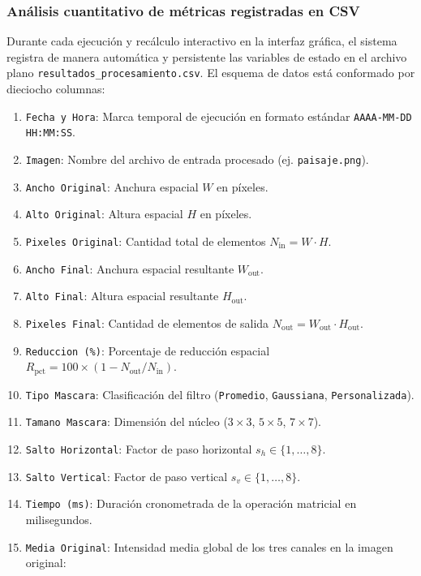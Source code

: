 \documentclass[11pt]{article}
\begin{document}
\subsubsection{Análisis cuantitativo de métricas registradas en CSV}

Durante cada ejecución y recálculo interactivo en la interfaz gráfica, el sistema registra de manera automática y persistente las variables de estado en el archivo plano \texttt{resultados\_procesamiento.csv}. El esquema de datos está conformado por dieciocho columnas:
\begin{enumerate}[itemsep=0.15em]
\item \texttt{Fecha y Hora}: Marca temporal de ejecución en formato estándar \texttt{AAAA-MM-DD HH:MM:SS}.
\item \texttt{Imagen}: Nombre del archivo de entrada procesado (ej. \texttt{paisaje.png}).
\item \texttt{Ancho Original}: Anchura espacial $W$ en píxeles.
\item \texttt{Alto Original}: Altura espacial $H$ en píxeles.
\item \texttt{Pixeles Original}: Cantidad total de elementos $N_{\text{in}} = W \cdot H$.
\item \texttt{Ancho Final}: Anchura espacial resultante $W_{\text{out}}$.
\item \texttt{Alto Final}: Altura espacial resultante $H_{\text{out}}$.
\item \texttt{Pixeles Final}: Cantidad de elementos de salida $N_{\text{out}} = W_{\text{out}} \cdot H_{\text{out}}$.
\item \texttt{Reduccion (\%)}: Porcentaje de reducción espacial $R_{\text{pct}} = 100 \times (1 - N_{\text{out}} / N_{\text{in}})$.
\item \texttt{Tipo Mascara}: Clasificación del filtro (\texttt{Promedio}, \texttt{Gaussiana}, \texttt{Personalizada}).
\item \texttt{Tamano Mascara}: Dimensión del núcleo ($3\times3$, $5\times5$, $7\times7$).
\item \texttt{Salto Horizontal}: Factor de paso horizontal $s_h \in \{1, \ldots, 8\}$.
\item \texttt{Salto Vertical}: Factor de paso vertical $s_v \in \{1, \ldots, 8\}$.
\item \texttt{Tiempo (ms)}: Duración cronometrada de la operación matricial en milisegundos.
\item \texttt{Media Original}: Intensidad media global de los tres canales en la imagen original:
\begin{equation}

\end{equation}
\end{enumerate}
\end{document}
